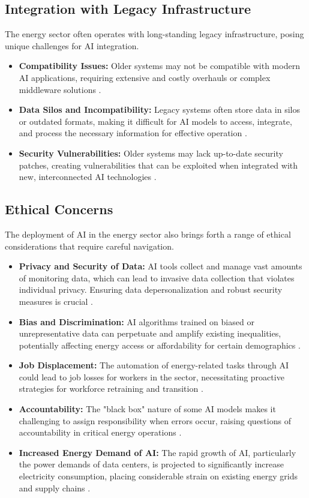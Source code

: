 \subsection{Integration with Legacy Infrastructure}
The energy sector often operates with long-standing legacy infrastructure, posing unique challenges for AI integration.
\begin{itemize}
    \item \textbf{Compatibility Issues:} Older systems may not be compatible with modern AI applications, requiring extensive and costly overhauls or complex middleware solutions \cite{BuildPrompt_AI_Legacy}.
    \item \textbf{Data Silos and Incompatibility:} Legacy systems often store data in silos or outdated formats, making it difficult for AI models to access, integrate, and process the necessary information for effective operation \cite{ITSolI_AI_Legacy}.
    \item \textbf{Security Vulnerabilities:} Older systems may lack up-to-date security patches, creating vulnerabilities that can be exploited when integrated with new, interconnected AI technologies \cite{BrillianceSecurity_AI_Legacy}.
\end{itemize}

\subsection{Ethical Concerns}
The deployment of AI in the energy sector also brings forth a range of ethical considerations that require careful navigation.
\begin{itemize}
    \item \textbf{Privacy and Security of Data:} AI tools collect and manage vast amounts of monitoring data, which can lead to invasive data collection that violates individual privacy. Ensuring data depersonalization and robust security measures is crucial \cite{SustainLivWork_AI_Energy, TrustCloud_AI_Privacy}.
    \item \textbf{Bias and Discrimination:} AI algorithms trained on biased or unrepresentative data can perpetuate and amplify existing inequalities, potentially affecting energy access or affordability for certain demographics \cite{SustainabilityDirectory_AI_Energy, ScaleFocus_AI_Privacy}.
    \item \textbf{Job Displacement:} The automation of energy-related tasks through AI could lead to job losses for workers in the sector, necessitating proactive strategies for workforce retraining and transition \cite{SustainabilityDirectory_AI_Energy}.
    \item \textbf{Accountability:} The "black box" nature of some AI models makes it challenging to assign responsibility when errors occur, raising questions of accountability in critical energy operations \cite{EnergyRev_AI_Energy}.
\item \textbf{Increased Energy Demand of AI:} The rapid growth of AI, particularly the power demands of data centers, is projected to significantly increase electricity consumption, placing considerable strain on existing energy grids and supply chains \cite{IEA_AI_Energy_Initial}.
\end{itemize}

